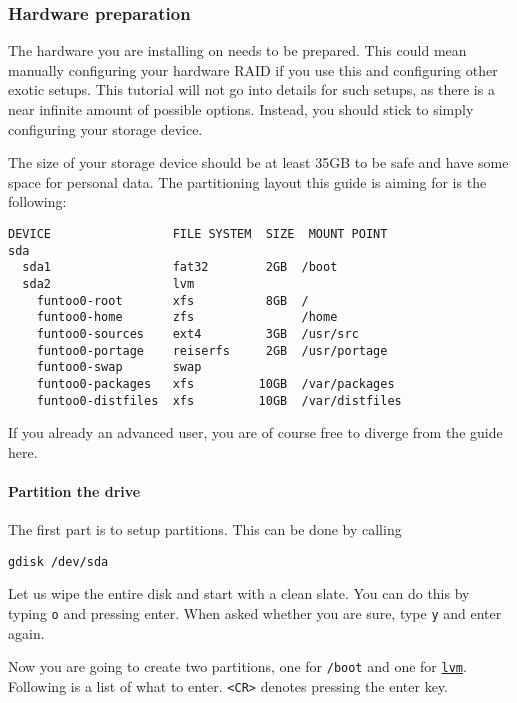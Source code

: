\subsubsection{Hardware preparation}\label{hardware-preparation}

The hardware you are installing on needs to be prepared. This could mean
manually configuring your hardware RAID if you use this and configuring
other exotic setups. This tutorial will not go into details for such
setups, as there is a near infinite amount of possible options. Instead,
you should stick to simply configuring your storage device.

The size of your storage device should be at least 35GB to be safe and
have some space for personal data. The partitioning layout this guide is
aiming for is the following:

\begin{verbatim}
DEVICE                 FILE SYSTEM  SIZE  MOUNT POINT
sda
  sda1                 fat32        2GB  /boot
  sda2                 lvm
    funtoo0-root       xfs          8GB  /
    funtoo0-home       zfs               /home
    funtoo0-sources    ext4         3GB  /usr/src
    funtoo0-portage    reiserfs     2GB  /usr/portage
    funtoo0-swap       swap
    funtoo0-packages   xfs         10GB  /var/packages
    funtoo0-distfiles  xfs         10GB  /var/distfiles
\end{verbatim}

If you already an advanced user, you are of course free to diverge from
the guide here.

\paragraph{Partition the drive}\label{partition-the-drive}

The first part is to setup partitions. This can be done by calling

\texttt{gdisk\ /dev/sda}

Let us wipe the entire disk and start with a clean slate. You can do
this by typing \texttt{o} and pressing enter. When asked whether you are
sure, type \texttt{y} and enter again.

Now you are going to create two partitions, one for \texttt{/boot} and
one for
\href{https://en.wikipedia.org/wiki/Logical_Volume_Manager_(Linux)}{\texttt{lvm}}.
Following is a list of what to enter.
\texttt{\textless{}CR\textgreater{}} denotes pressing the enter key.

